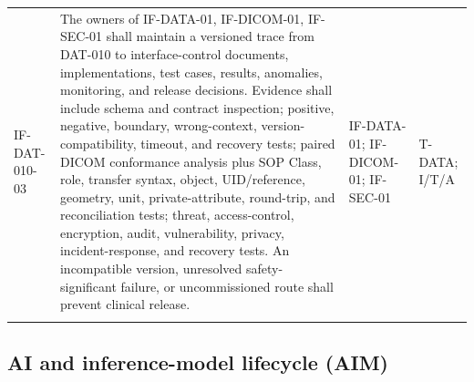 \documentclass[11pt,letterpaper]{article}
\begin{document}
\begin{scriptsize}
\begin{longtable}{@{}L{0.14\textwidth}L{0.49\textwidth}L{0.19\textwidth}L{0.10\textwidth}@{}}
\addlinespace[2pt]
\mbox{IF-DAT-010-03} & The owners of IF-DATA-01, IF-DICOM-01, IF-SEC-01 shall maintain a versioned trace from DAT-010 to interface-control documents, implementations, test cases, results, anomalies, monitoring, and release decisions. Evidence shall include schema and contract inspection; positive, negative, boundary, wrong-context, version-compatibility, timeout, and recovery tests; paired DICOM conformance analysis plus SOP Class, role, transfer syntax, object, UID\slash\allowbreak{}reference, geometry, unit, private-attribute, round-trip, and reconciliation tests; threat, access-control, encryption, audit, vulnerability, privacy, incident-response, and recovery tests. An incompatible version, unresolved safety-significant failure, or uncommissioned route shall prevent clinical release. & IF-DATA-01; IF-DICOM-01; IF-SEC-01 & T-DATA; I\slash\allowbreak{}T\slash\allowbreak{}A \\
\addlinespace[2pt]
\end{longtable}
\end{scriptsize}

\subsection{AI and inference-model lifecycle (AIM)}
\end{document}
